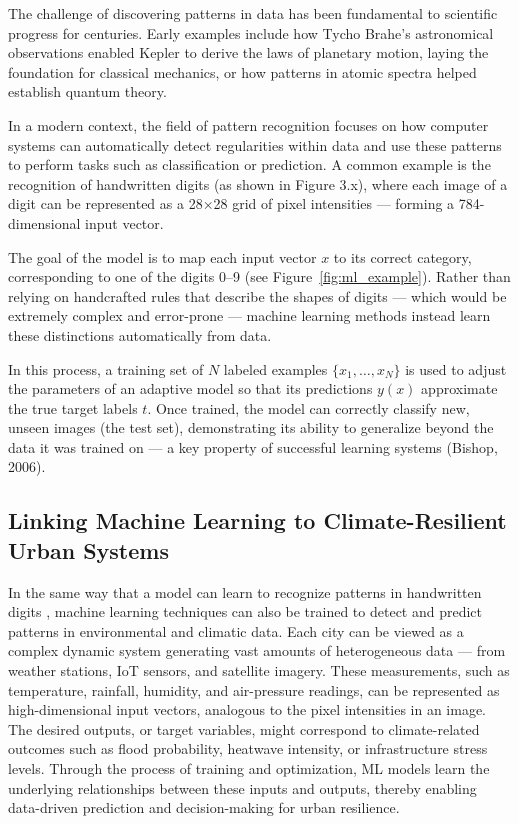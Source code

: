 \documentclass[12pt]{article}
\begin{document}
The challenge of discovering patterns in data has been fundamental to scientific progress for centuries. 
Early examples include how Tycho Brahe’s astronomical observations enabled Kepler to derive the laws of planetary motion, 
laying the foundation for classical mechanics, or how patterns in atomic spectra helped establish quantum theory.

In a modern context, the field of pattern recognition focuses on how computer systems can automatically detect regularities 
within data and use these patterns to perform tasks such as classification or prediction. A common example is the recognition 
of handwritten digits (as shown in Figure 3.x), where each image of a digit can be represented as a 28×28 grid of pixel 
intensities — forming a 784-dimensional input vector.

The goal of the model is to map each input vector $x$ to its correct category, corresponding to one of the digits 0–9 (see Figure~\ref{fig:ml_example}). Rather than relying on handcrafted rules that describe the shapes of digits — which would be extremely complex and error-prone — machine learning methods instead learn these distinctions automatically from data.

In this process, a training set of $N$ labeled examples $\{x_1, \dots, x_N\}$ is used to adjust the parameters of an adaptive model so that its predictions $y(x)$ approximate the true target labels $t$. Once trained, the model can correctly classify new, unseen images (the test set), demonstrating its ability to generalize beyond the data it was trained on — a key property of successful learning systems (Bishop, 2006).

\subsection{Linking Machine Learning to Climate-Resilient Urban Systems}

In the same way that a model can learn to recognize patterns in handwritten digits \cite{bishop2006pattern}, machine learning techniques can also be trained to detect and predict patterns in environmental and climatic data. 
Each city can be viewed as a complex dynamic system generating vast amounts of heterogeneous data --- from weather stations, IoT sensors, and satellite imagery. 
These measurements, such as temperature, rainfall, humidity, and air-pressure readings, can be represented as high-dimensional input vectors, analogous to the pixel intensities in an image. 
The desired outputs, or target variables, might correspond to climate-related outcomes such as flood probability, heatwave intensity, or infrastructure stress levels. 
Through the process of training and optimization, ML models learn the underlying relationships between these inputs and outputs, thereby enabling data-driven prediction and decision-making for urban resilience.
\end{document}
